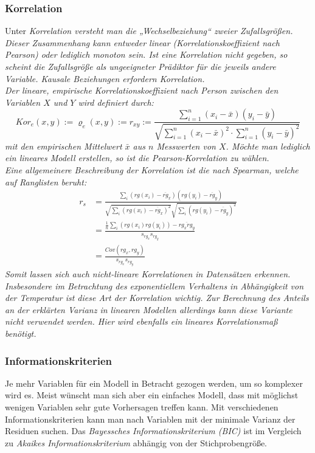 \subsubsection{Korrelation}
Unter \it{Korrelation} versteht man die „Wechselbeziehung“ zweier Zufallsgrößen.
Dieser Zusammenhang kann entweder \it{linear} (Korrelationskoeffizient nach Pearson) oder lediglich \it{monoton} sein.
Ist eine Korrelation nicht gegeben, so scheint die Zufallsgröße als ungeeigneter Prädiktor für die jeweils andere Variable.
Kausale Beziehungen erfordern Korrelation.
\\
Der \it{lineare, empirische Korrelationskoeffizient nach Person} zwischen den Variablen $X$ und $Y$ wird definiert durch:
\begin{equation}
	Kor_e(x,y) := \varrho_e(x,y) := r_{xy} := \frac{
		\sum_{i=1}^n(x_i-\bar x)(y_i-\bar y)
	}{
	\sqrt{
		\sum_{i=1}^n(x_i-\bar x)^2\cdot
		\sum_{i=1}^n(y_i-\bar y)^2
	}
	}
\end{equation}
mit den empirischen Mittelwert $\bar x$ aus $n$ Messwerten von $X$.
Möchte man lediglich ein \it{lineares} Modell erstellen, so ist die Pearson-Korrelation zu wählen.
\\
Eine allgemeinere Beschreibung der Korrelation ist die nach \it{Spearman}, welche auf Ranglisten beruht:\\
\begin{align}
	r_s &= \frac{\sum_{i}(rg(x_i)-\overline{rg}_x)(rg(y_i)-\overline{rg}_y)} {\sqrt{\sum_{i}(rg(x_i)-\overline{rg}_x) ^2}\sqrt{\sum_{i}(rg(y_i)-\overline{rg}_y)^2}}\\
	&= \frac { \frac{1}{n} \sum_{i}(rg(x_{i})  rg(y_{i})) - \overline{rg_x rg_y}  }{s_{rg_x} s_{rg_y}} \\
	&= \frac {{Cov}(rg_{x},rg_{y} )} { s_{rg_x} s_{rg_y} }
\end{align}
Somit lassen sich auch nicht-lineare Korrelationen in Datensätzen erkennen.
Insbesondere im Betrachtung des exponentiellem Verhaltens in Abhängigkeit von der Temperatur ist diese Art der Korrelation wichtig.
Zur Berechnung des Anteils an der \it{erklärten} Varianz in linearen Modellen allerdings kann diese Variante nicht verwendet werden.
Hier wird ebenfalls ein lineares Korrelationsmaß benötigt.

\subsubsection{Informationskriterien}

Je mehr Variablen für ein Modell in Betracht gezogen werden, um so komplexer wird es.
Meist wünscht man sich aber ein einfaches Modell, dass mit möglichst wenigen Variablen sehr gute Vorhersagen treffen kann.
Mit verschiedenen Informationskriterien kann man nach Variablen mit der minimale Varianz der Residuen suchen.
Das \emph{Bayessches Informationskriterium (BIC)} ist im Vergleich zu \emph{Akaikes Informationskriterium} abhängig von der Stichprobengröße.

